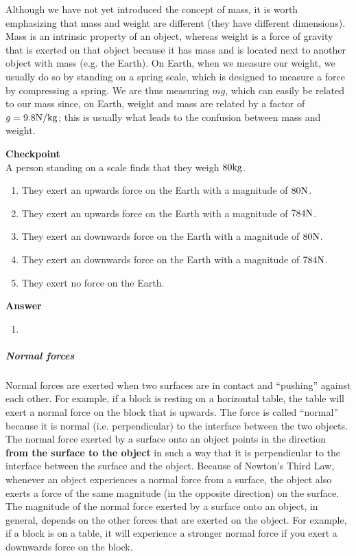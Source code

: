 Although we have not yet introduced the concept of mass, it is worth emphasizing that mass and weight are different (they have different dimensions). Mass is an intrinsic property of an object, whereas weight is a force of gravity that is exerted on that object because it has mass and is located next to another object with mass (e.g. the Earth). On Earth, when we measure our weight, we usually do so by standing on a spring scale, which is designed to measure a force by compressing a spring. We are thus measuring $mg$, which can easily be related to our mass since, on Earth, weight and mass are related by a factor of $g=9.8 {\rm N/kg}$; this is usually what leads to the confusion between mass and weight.

\begin{framed}
\textbf{Checkpoint}\\
A person standing on a scale finds that they weigh $80 {\rm kg}$.

\begin{enumerate}
\item They exert an upwards force on the Earth with a magnitude of $80 {\rm N}$.
\item They exert an upwards force on the Earth with a magnitude of $784 {\rm N}$.
\item They exert an downwards force on the Earth with a magnitude of $80 {\rm N}$.
\item They exert an downwards force on the Earth with a magnitude of $784 {\rm N}$.
\item They exert no force on the Earth.
\end{enumerate}

\begin{framed}
\textbf{Answer}\\
\begin{enumerate}[resume]
\item
\end{enumerate}
\end{framed}
\end{framed}

\subparagraph{Normal forces}

Normal forces are exerted when two surfaces are in contact and ``pushing'' against each other. For example, if a block is resting on a horizontal table, the table will exert a normal force on the block that is upwards. The force is called ``normal'' because it is normal (i.e. perpendicular) to the interface between the two objects. The normal force exerted by a surface onto an object points in the direction \textbf{from the surface to the object} in such a way that it is perpendicular to the interface between the surface and the object. Because of Newton's Third Law, whenever an object experiences a normal force from a surface, the object also exerts a force of the same magnitude (in the opposite direction) on the surface. The magnitude of the normal force exerted by a surface onto an object, in general, depends on the other forces that are exerted on the object. For example, if a block is on a table, it will experience a stronger normal force if you exert a downwards force on the block.

